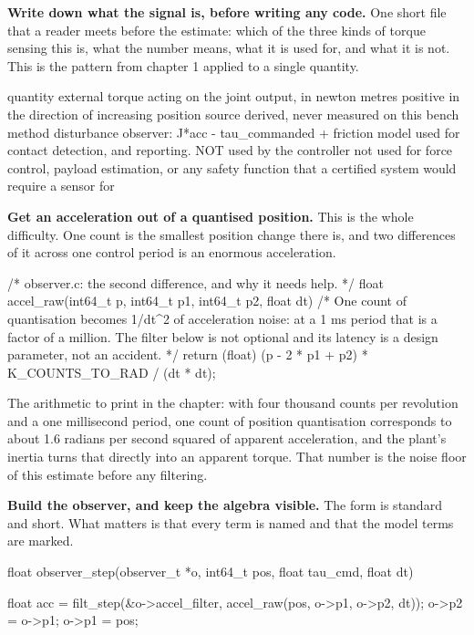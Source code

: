 \begin{steps}
\item \textbf{Write down what the signal is, before writing any code.} One
short file that a reader meets before the estimate: which of the three kinds of
torque sensing this is, what the number means, what it is used for, and what it
is not. This is the pattern from chapter 1 applied to a single quantity.
\begin{plaincode}
quantity     external torque acting on the joint output, in newton metres
positive     in the direction of increasing position
source       derived, never measured on this bench
method       disturbance observer: J*acc - tau_commanded + friction model
used for     contact detection, and reporting. NOT used by the controller
not used for force control, payload estimation, or any safety function that
             a certified system would require a sensor for
\end{plaincode}

\item \textbf{Get an acceleration out of a quantised position.} This is the
whole difficulty. One count is the smallest position change there is, and two
differences of it across one control period is an enormous acceleration.
\begin{ccode}
/* observer.c: the second difference, and why it needs help. */
float accel_raw(int64_t p, int64_t p1, int64_t p2, float dt)
{
    /* One count of quantisation becomes 1/dt^2 of acceleration noise: at a
       1 ms period that is a factor of a million. The filter below is not
       optional and its latency is a design parameter, not an accident. */
    return (float) (p - 2 * p1 + p2) * K_COUNTS_TO_RAD / (dt * dt);
}
\end{ccode}
The arithmetic to print in the chapter: with four thousand counts per revolution
and a one millisecond period, one count of position quantisation corresponds to
about 1.6 radians per second squared of apparent acceleration, and the plant's
inertia turns that directly into an apparent torque. That number is the noise
floor of this estimate before any filtering.

\item \textbf{Build the observer, and keep the algebra visible.} The form is
standard and short. What matters is that every term is named and that the model
terms are marked.
\begin{ccode}
float observer_step(observer_t *o, int64_t pos, float tau_cmd, float dt)
{
    float acc = filt_step(&o->accel_filter, accel_raw(pos, o->p1, o->p2, dt));
    o->p2 = o->p1; o->p1 = pos;

}
\end{ccode}
\end{steps}
